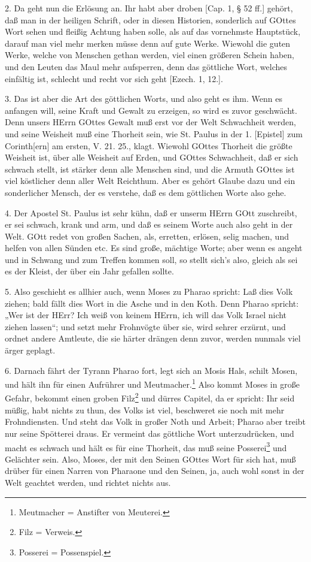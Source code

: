 2. Da geht nun die Erlösung an. Ihr habt aber droben [Cap. 1, § 52 ff.] gehört, daß man in der heiligen Schrift, oder in diesen Historien, sonderlich auf GOttes Wort sehen und fleißig Achtung haben solle, als auf das vornehmste Hauptstück, darauf man viel mehr merken müsse denn auf gute Werke. Wiewohl die guten Werke, welche von Menschen gethan werden, viel einen größeren Schein haben, und den Leuten das Maul mehr aufsperren, denn das göttliche Wort, welches einfältig ist, schlecht und recht vor sich geht [Ezech. 1, 12.].

3. Das ist aber die Art des göttlichen Worts, und also geht es ihm. Wenn es anfangen will, seine Kraft und Gewalt zu erzeigen, so wird es
zuvor geschwächt. Denn unsers HErrn GOttes Gewalt muß erst vor der Welt Schwachheit werden, und seine Weisheit muß eine Thorheit sein, wie St. Paulus in der 1. [Epistel] zum Corinth[ern] am ersten, V. 21. 25., klagt. Wiewohl GOttes Thorheit die größte Weisheit ist, über alle Weisheit auf Erden, und GOttes Schwachheit, daß er sich schwach stellt, ist stärker denn alle Menschen sind, und die Armuth GOttes ist viel köstlicher denn aller Welt Reichthum. Aber es gehört Glaube dazu und ein sonderlicher Mensch, der es verstehe, daß es dem göttlichen Worte also gehe.

4. Der Apostel St. Paulus ist sehr kühn, daß er unserm HErrn GOtt zuschreibt, er sei schwach, krank und arm, und daß es seinem Worte auch also geht in der Welt. GOtt redet von großen Sachen, als, erretten, erlösen, selig machen, und helfen von allen Sünden etc. Es sind große, mächtige Worte; aber wenn es angeht und in Schwang und zum Treffen kommen soll, so stellt sich’s also, gleich als sei es der Kleist, der über ein Jahr gefallen sollte.

5. Also geschieht es allhier auch, wenn Moses zu Pharao spricht: Laß dies Volk ziehen; bald fällt dies Wort in die Asche und in den Koth. Denn Pharao spricht: „Wer ist der HErr? Ich weiß von keinem HErrn, ich will das Volk Israel nicht ziehen lassen“; und setzt mehr Frohnvögte über sie, wird sehrer erzürnt, und ordnet andere Amtleute, die sie härter drängen denn zuvor, werden nunmals viel ärger geplagt.

6. Darnach fährt der Tyrann Pharao fort, legt sich an Mosis Hals, schilt Mosen, und hält ihn für einen Aufrührer und Meutmacher.\footnote{Meutmacher = Anstifter von Meuterei.} Also kommt Moses in große Gefahr, bekommt einen groben Filz\footnote{Filz = Verweis.} und dürres Capitel, da er spricht: Ihr seid müßig, habt nichts zu thun, des Volks ist viel, beschweret sie noch mit mehr Frohndiensten. Und steht das Volk in großer Noth und Arbeit; Pharao aber treibt nur seine Spötterei draus. Er vermeint das göttliche Wort unterzudrücken, und macht es schwach und hält es für eine Thorheit, das muß seine Posserei\footnote{Posserei = Possenspiel.} und Gelächter sein. Also, Moses, der mit den Seinen GOttes Wort für sich hat, muß drüber für einen Narren von Pharaone und den Seinen, ja, auch wohl sonst in der Welt geachtet werden, und richtet nichts aus.

